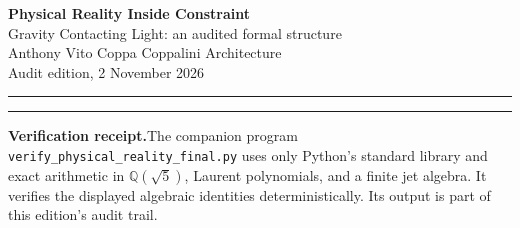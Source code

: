 \documentclass[10pt]{article}
\theoremstyle{remark}
\newcommand{\Ev}{\operatorname{Ev}}
\newcommand{\Id}{\mathsf{Id}}
\newcommand{\N}{\mathbb N}
\begin{document}
\begin{center}
{\LARGE\bfseries Physical Reality Inside Constraint}\\[3pt]
{\large Gravity Contacting Light: an audited formal structure}\\[8pt]
{\normalsize Anthony Vito Coppa \quad\textbar\quad Coppalini Architecture}\\[2pt]
{\small Audit edition, 2 November 2026}
\end{center}

\vspace{2pt}\hrule\vspace{8pt}

\begin{abstract}
This paper proves a receipt-preserving contact calculus.  The evaluation map
\(\Ev:P^*\to(\N_{>0},\times)\) is the surjective, non-injective
abelianization of ordered prime words; the root carrier
\[
G=\begin{pmatrix}-2&1\\1&2\end{pmatrix}
\]
satisfies \(G^2=5I\) and has split signature \((1,1)\); the inertia of
\(Q\otimes Q\) is \((2,2)\), while \(G\oplus I_2\) has inertia \((3,1)\);
the pp-wave curvature law, Fibonacci correction, and reduced Burau identities
hold under their displayed hypotheses; and the future-boundary registry
\(\widehat K=K\cup\{\mathbf F\}\) preserves historical receipts by append-only
admission.

Its physical contact relation is
\[
G_{\mathrm{embodied}}=e,\qquad \Pi(e,\ell)=c,\qquad
c=(e,\ell,w,r),\qquad \Id(c)=(e,\ell,w,r).
\]
Here the embodied metric carrier \(e\) contacts light \(\ell\) at an ordered,
receipt-bearing address.  The paper carries this relation through exact
arithmetic, matrix normal form, braid parity, and deterministic verification.
Every result retains its earned office: exact theorem, definition, supplied
postulate, contact relation, implementation, or pending occurrence.
\end{abstract}

\vspace{2pt}\hrule\vspace{6pt}

\textbf{Verification receipt.}\enspace The companion program
\texttt{verify\_physical\_reality\_final.py} uses only Python's standard
library and exact arithmetic in $\mathbb Q(\sqrt5)$, Laurent polynomials,
and a finite jet algebra.  It verifies the displayed algebraic identities
deterministically.  Its output is part of this edition's audit trail.
\end{document}
